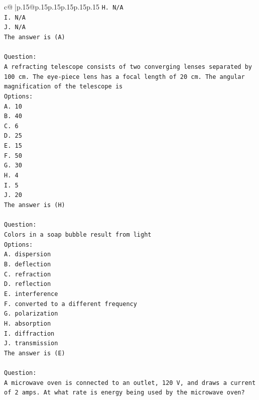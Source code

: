 \documentclass{article}
\begin{document}
{\begin{supertabular}{c@{$\;$}|p{.15\linewidth}@{}p{.15\linewidth}p{.15\linewidth}p{.15\linewidth}p{.15\linewidth}p{.15\linewidth}}
{{{\texttt{H. N/A} \\
\texttt{I. N/A} \\
\texttt{J. N/A} \\
\texttt{The answer is (A)} \\
\\ 
\texttt{Question:} \\
\texttt{A refracting telescope consists of two converging lenses separated by 100 cm. The eye{-}piece lens has a focal length of 20 cm. The angular magnification of the telescope is} \\
\texttt{Options:} \\
\texttt{A. 10} \\
\texttt{B. 40} \\
\texttt{C. 6} \\
\texttt{D. 25} \\
\texttt{E. 15} \\
\texttt{F. 50} \\
\texttt{G. 30} \\
\texttt{H. 4} \\
\texttt{I. 5} \\
\texttt{J. 20} \\
\texttt{The answer is (H)} \\
\\ 
\texttt{Question:} \\
\texttt{Colors in a soap bubble result from light} \\
\texttt{Options:} \\
\texttt{A. dispersion} \\
\texttt{B. deflection} \\
\texttt{C. refraction} \\
\texttt{D. reflection} \\
\texttt{E. interference} \\
\texttt{F. converted to a different frequency} \\
\texttt{G. polarization} \\
\texttt{H. absorption} \\
\texttt{I. diffraction} \\
\texttt{J. transmission} \\
\texttt{The answer is (E)} \\
\\ 
\texttt{Question:} \\
\texttt{A microwave oven is connected to an outlet, 120 V, and draws a current of 2 amps. At what rate is energy being used by the microwave oven?} \\
}}}
\end{supertabular}}
\end{document}
